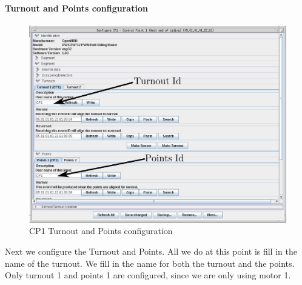 \clearpage
\paragraph{Turnout and Points configuration}
\begin{figure}[hbpt]\begin{centering}%
\includegraphics[width=5in]{CP1-Turnout-Config-Annotated.png}
\caption{CP1 Turnout and Points configuration}
\label{fig:CP1-Turnout-Config}
\end{centering}\end{figure}
Next we configure the Turnout and Points.  All we do at this point is fill in 
the name of the turnout.  We fill in the name for both the turnout and the 
points.  Only turnout 1 and points 1 are configured, since we are only using 
motor 1.

\clearpage
